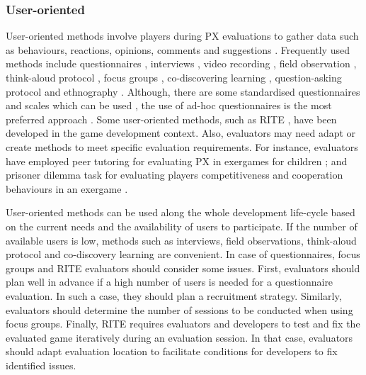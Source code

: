 \subsubsection{User-oriented}
User-oriented methods involve players during \ac{PX} evaluations to gather data such as behaviours, reactions, opinions, comments and suggestions \autocite{Yanez-Gomez2017,Bernhaupt2015,Drachen2013}. Frequently used methods include questionnaires \autocite{Yanez-Gomez2017,Ho2017,Wiemeyer2016,Nacke2015,Mueller2015,Bernhaupt2015,Zhao2016,Lapas2015,Nijhar2012,Nackea}, interviews \autocite{Wiemeyer2016,Moosajee,Nacke2015,Nijhar2012,Nackea}, video recording \autocite{Wiemeyer2016,Moosajee,Mueller2015,Nijhar2012}, field observation \autocite{Yanez-Gomez2017,Wiemeyer2016,Nacke2015}, think-aloud protocol \autocite{Wiemeyer2016,Nacke2015,desurvire_methods_2013}, focus groups \autocite{Yanez-Gomez2017,Nacke2015}, co-discovering learning \autocite{Yanez-Gomez2017}, question-asking protocol \autocite{Yanez-Gomez2017} and ethnography \autocite{Nackea}. Although, there are some standardised questionnaires and scales which can be used \autocite{denisova_convergence_2016,VandenAbeele2016,Calvillo-Gamez2015,Brockmyer2009,Poels2008,DeKort2007,Vorderer2004}, the use of ad-hoc questionnaires is the most preferred approach \autocite{Yanez-Gomez2017}. Some user-oriented methods, such as \ac{RITE} \autocite{Moosajee,Nackea}, have been developed in the game development context. Also, evaluators may need adapt or create methods to meet specific evaluation requirements. For instance, evaluators have employed peer tutoring for evaluating PX in exergames for children \autocite{Hoysniemi2003}; and prisoner dilemma task for evaluating players competitiveness and cooperation behaviours in an exergame \autocite{Mueller2015}.

User-oriented methods can be used along the whole development life-cycle based on the current needs and the availability of users to participate. If the number of available users is low, methods such as interviews, field observations, think-aloud protocol and co-discovery learning are convenient. In case of questionnaires, focus groups and \ac{RITE} evaluators should consider some issues. First, evaluators should plan well in advance if a high number of users is needed for a questionnaire evaluation. In such a case, they should plan a recruitment strategy. Similarly, evaluators should determine the number of sessions to be conducted when using focus groups. Finally, \ac{RITE} requires evaluators and developers to test and fix the evaluated game iteratively during an evaluation session. In that case, evaluators should adapt evaluation location to facilitate conditions for developers to fix identified issues.

